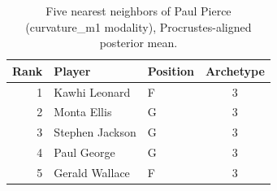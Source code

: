 \begin{table}[htbp]
  \centering\small
  \begin{tabular}{rllc}
    \toprule
    Rank & Player & Position & Archetype \\
    \midrule
    1 & Kawhi Leonard & F & 3 \\
    2 & Monta Ellis & G & 3 \\
    3 & Stephen Jackson & G & 3 \\
    4 & Paul George & G & 3 \\
    5 & Gerald Wallace & F & 3 \\
    \bottomrule
  \end{tabular}
  \caption{Five nearest neighbors of Paul Pierce (curvature_m1 modality), Procrustes-aligned posterior mean.}
  \label{tab:Paul_Pierce_neighbors_curvature_m1}
\end{table}

